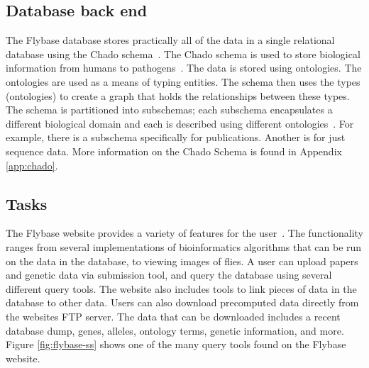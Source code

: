 \documentclass[12pt]{ucthesis}
\begin{document}
\subsection{Database back end}
The Flybase database stores practically all of the data in a single relational database using the Chado schema~\cite{flybase_query_tools}. The Chado schema is used to store biological information from humans to pathogens~\cite{chado}. The data is stored using ontologies. The ontologies are used as a means of typing entities. The schema then uses the types (ontologies) to create a graph that holds the relationships between these types. The schema is partitioned into subschemas; each subschema encapsulates a different biological domain and each is described using different ontologies~\cite{chado}. For example, there is a subschema specifically for publications. Another is for just sequence data. More information on the Chado Schema is found in Appendix \ref{app:chado}.

\subsection{Tasks}
The Flybase website provides a variety of features for the user~\cite{flybase}. The functionality ranges from several implementations of bioinformatics algorithms that can be run on the data in the database, to viewing images of flies. A user can upload papers and genetic data via submission tool, and query the database using several different query tools. The website also includes tools to link pieces of data in the database to other data. Users can also download precomputed data directly from the websites FTP server. The data that can be downloaded includes a recent database dump, genes, alleles, ontology terms, genetic information, and more. Figure \ref{fig:flybase-ss}
shows one of the many query tools found on the Flybase website.
\end{document}
